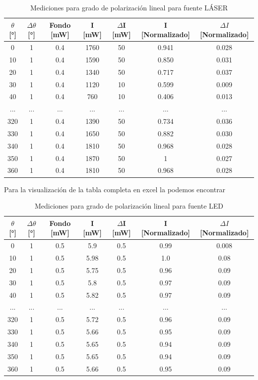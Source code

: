 \documentclass[article,12pt]{elsarticle}
\begin{document}
\begin{table}[H]
\centering
{}
\begin{tabular}{|c|c|c|c|c|c|c|}
\hline
\rowcolor{cyan!40}
$\theta$[°] & $\Delta \theta$ [°] & Fondo [mW] & I [mW] & $\Delta$I [mW] & 
 I [Normalizado] & $\Delta I$[Normalizado] \\
\hline
0 & 1 & 0.4 & 1760 & 50 & 0.941 & 0.028\\
10 & 1 & 0.4 & 1590 & 50 & 0.850 & 0.031 \\
20 & 1 & 0.4 & 1340 & 50 & 0.717 & 0.037\\
30 & 1 & 0.4 & 1120 & 10 & 0.599 & 0.009\\
40 & 1 & 0.4 & 760 & 10 & 0.406 & 0.013\\
... & ... & ... & ... & ... & ... & ... \\
320 & 1 & 0.4 & 1390 & 50 & 0.734 & 0.036\\
330 & 1 & 0.4 & 1650 & 50 & 0.882 & 0.030\\
340 & 1 & 0.4 & 1810 & 50 & 0.968 & 0.028\\
350 & 1 & 0.4 & 1870 & 50 & 1 & 0.027\\
360 & 1 & 0.4 & 1810 & 50 & 0.968 & 0.028\\
\hline
\end{tabular}
\caption{Mediciones para grado de polarización lineal para fuente LÁSER}
\end{table}


Para la visualización de la tabla completa en excel la podemos encontrar \cite{Excel}


\begin{table}[H]
\centering
{}
\begin{tabular}{|c|c|c|c|c|c|c|}
\hline
\rowcolor{green!40}
$\theta$[°] & $\Delta \theta$ [°] & Fondo [mW] & I [mW] & $\Delta$I [mW] & 
 I [Normalizado] & $\Delta I$[Normalizado] \\
\hline
0 & 1 & 0.5 & 5.9 & 0.5 & 0.99 & 0.008\\
10 & 1 & 0.5 & 5.98 & 0.5 & 1.0 & 0.08 \\
20 & 1 & 0.5 & 5.75 & 0.5 & 0.96 & 0.09\\
30 & 1 & 0.5 & 5.8 & 0.5 & 0.97 & 0.09\\
40 & 1 & 0.5 & 5.82 & 0.5 & 0.97 & 0.09\\
... & ... & ... & ... & ... & ... & ... \\
320 & 1 & 0.5 & 5.72 & 0.5 & 0.96 & 0.09\\
330 & 1 & 0.5 & 5.66 & 0.5 & 0.95 & 0.09\\
340 & 1 & 0.5 & 5.65 & 0.5 & 0.94 & 0.09\\
350 & 1 & 0.5 & 5.65 & 0.5 & 0.94 & 0.09\\
360 & 1 & 0.5 & 5.66 & 0.5 & 0.95 & 0.09\\
\hline
\end{tabular}
\caption{Mediciones para grado de polarización lineal para fuente LED}
\end{table}
\end{document}
